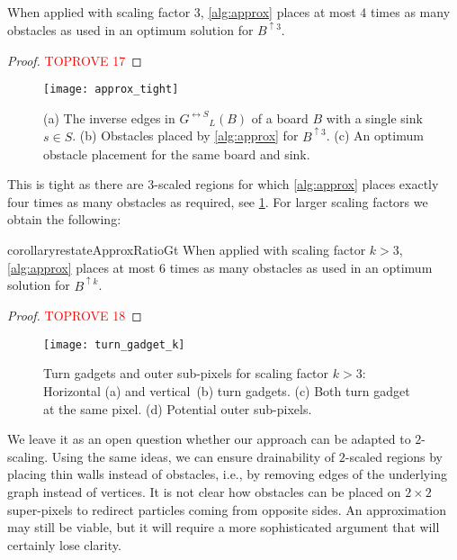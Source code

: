 \documentclass[a4paper,UKenglish,cleveref,thm-restate]{lipics-v2021}
\newcommand{\bScale}[2][k]{\ensuremath{{#2}^{\uparrow {#1}}}}
\newcommand{\gExt}[1][G]{\ensuremath{{#1}^{\leftrightarrow S}}}
\begin{document}
\begin{theorem}\label{approx_ratio}
When applied with scaling factor $3$, \cref{alg:approx} places at most $4$
times as many obstacles as used in an optimum solution for $\bScale[3]{B}$.
\end{theorem}
\begin{proof}\textcolor{red}{TOPROVE 17}\end{proof}

\begin{figure}[htb]
\centering
\texttt{[image: approx\_tight]}\caption{(a) The inverse edges in $\gExt_L(B)$ of a board $B$ with a single sink
$s \in S$. (b) Obstacles placed by \cref{alg:approx} for $\bScale[3]{B}$.
(c) An optimum obstacle placement for the same board and sink.}\label{fig:approx_tight}
\end{figure}

This is tight as there are $3$-scaled regions for which \cref{alg:approx} places exactly four times as many obstacles as required, see \cref{fig:approx_tight}.
For larger scaling factors we obtain the following:

\begin{restatable}{corollary}{restateApproxRatioGt}\label{approxratiogt}
When applied with scaling factor $k > 3$, \cref{alg:approx} places at most $6$
times as many obstacles as used in an optimum solution for $\bScale[k]{B}$.
\end{restatable}
\begin{proof}\textcolor{red}{TOPROVE 18}\end{proof}

\begin{figure}[htb]
    \centering
    \texttt{[image: turn\_gadget\_k]}\caption{Turn gadgets and outer sub-pixels for scaling factor $k > 3$:
    Horizontal (a) and vertical~(b) turn gadgets. (c) Both turn gadget at the same pixel. (d) Potential outer sub-pixels.}\label{fig:turn_gadget_k}
\end{figure}

We leave it as an open question whether our approach can be adapted to
$2$-scaling. Using the same ideas, we can ensure drainability of $2$-scaled
regions by placing thin walls instead of obstacles, i.e., by removing edges of
the underlying graph instead of vertices. It is not clear how obstacles can be
placed on $2 \times 2$ super-pixels to redirect particles coming from opposite
sides. An approximation may still be viable, but it will require a more
sophisticated argument that will certainly lose clarity.
\end{document}
